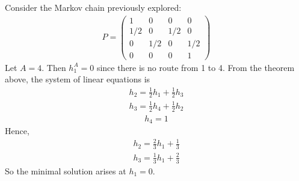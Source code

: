 \begin{example}
	Consider the Markov chain previously explored:
	\begin{align*}
		P = \begin{pmatrix}
			1   & 0   & 0   & 0   \\
			1/2 & 0   & 1/2 & 0   \\
			0   & 1/2 & 0   & 1/2 \\
			0   & 0   & 0   & 1
		\end{pmatrix}
	\end{align*}
	Let $A = \qty{4}$.
	Then $h_1^A = 0$ since there is no route from 1 to 4.
	From the theorem above, the system of linear equations is
	\begin{align*}
		h_2 = \frac{1}{2} h_1 + \frac{1}{2} h_3
	\end{align*}
	\begin{align*}
		h_3 = \frac{1}{2} h_4 + \frac{1}{2} h_2
	\end{align*}
	\begin{align*}
		h_4 = 1
	\end{align*}
	Hence,
	\begin{align*}
		h_2 = \frac{2}{3} h_1 + \frac{1}{3}
	\end{align*}
	\begin{align*}
		h_3 = \frac{1}{3} h_1 + \frac{2}{3}
	\end{align*}
	So the minimal solution arises at $h_1 = 0$.
\end{example}


